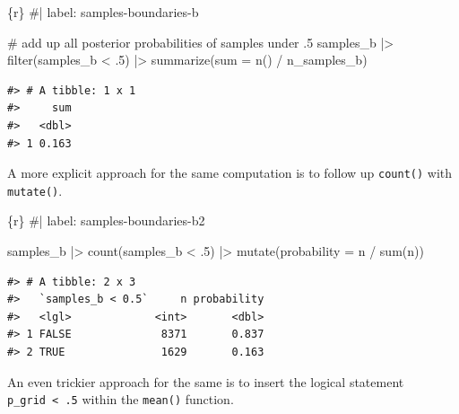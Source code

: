\documentclass[
  letterpaper,
  DIV=11,
  numbers=noendperiod]{scrreprt}
\newenvironment{Shaded}{\begin{snugshade}}{\end{snugshade}}
\newcommand{\AttributeTok}[1]{\textcolor[rgb]{0.40,0.45,0.13}{#1}}
\newcommand{\CommentTok}[1]{\textcolor[rgb]{0.37,0.37,0.37}{#1}}
\newcommand{\DecValTok}[1]{\textcolor[rgb]{0.68,0.00,0.00}{#1}}
\newcommand{\FunctionTok}[1]{\textcolor[rgb]{0.28,0.35,0.67}{#1}}
\newcommand{\InformationTok}[1]{\textcolor[rgb]{0.37,0.37,0.37}{#1}}
\newcommand{\NormalTok}[1]{\textcolor[rgb]{0.00,0.23,0.31}{#1}}
\newcommand{\SpecialCharTok}[1]{\textcolor[rgb]{0.37,0.37,0.37}{#1}}
\begin{document}
\begin{Shaded}
\begin{Highlighting}[]
\InformationTok{\textasciigrave{}\textasciigrave{}\textasciigrave{}\{r\}}
\CommentTok{\#| label: samples{-}boundaries{-}b}

\CommentTok{\# add up all posterior probabilities of samples under .5}
\NormalTok{samples\_b }\SpecialCharTok{|\textgreater{}} 
    \FunctionTok{filter}\NormalTok{(samples\_b }\SpecialCharTok{\textless{}}\NormalTok{ .}\DecValTok{5}\NormalTok{) }\SpecialCharTok{|\textgreater{}} 
    \FunctionTok{summarize}\NormalTok{(}\AttributeTok{sum =} \FunctionTok{n}\NormalTok{() }\SpecialCharTok{/}\NormalTok{ n\_samples\_b)}
\InformationTok{\textasciigrave{}\textasciigrave{}\textasciigrave{}}
\end{Highlighting}
\end{Shaded}

\begin{verbatim}
#> # A tibble: 1 x 1
#>     sum
#>   <dbl>
#> 1 0.163
\end{verbatim}

A more explicit approach for the same computation is to follow up
\texttt{count()} with \texttt{mutate()}.

\begin{Shaded}
\begin{Highlighting}[]
\InformationTok{\textasciigrave{}\textasciigrave{}\textasciigrave{}\{r\}}
\CommentTok{\#| label: samples{-}boundaries{-}b2}

\NormalTok{samples\_b }\SpecialCharTok{|\textgreater{}} 
    \FunctionTok{count}\NormalTok{(samples\_b }\SpecialCharTok{\textless{}}\NormalTok{ .}\DecValTok{5}\NormalTok{) }\SpecialCharTok{|\textgreater{}} 
    \FunctionTok{mutate}\NormalTok{(}\AttributeTok{probability =}\NormalTok{ n }\SpecialCharTok{/} \FunctionTok{sum}\NormalTok{(n))}
\InformationTok{\textasciigrave{}\textasciigrave{}\textasciigrave{}}
\end{Highlighting}
\end{Shaded}

\begin{verbatim}
#> # A tibble: 2 x 3
#>   `samples_b < 0.5`     n probability
#>   <lgl>             <int>       <dbl>
#> 1 FALSE              8371       0.837
#> 2 TRUE               1629       0.163
\end{verbatim}

An even trickier approach for the same is to insert the logical
statement \texttt{p\_grid\ \textless{}\ .5} within the \texttt{mean()}
function.
\end{document}
